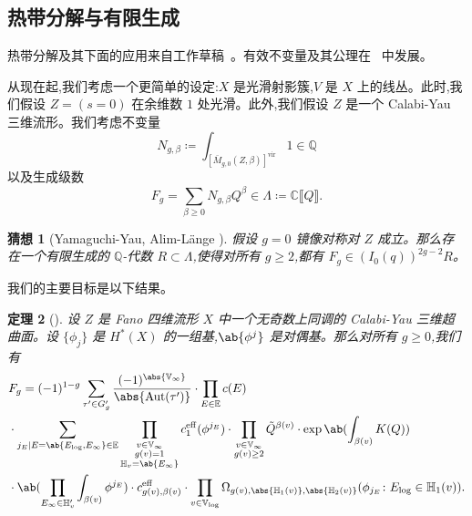\documentclass{amsart}
\newtheorem{thm}{定理}[section]
\newtheorem{conj}[thm]{猜想}
\theoremstyle{definition}
\theoremstyle{remark}
\theoremstyle{plain}
\theoremstyle{definition}
\theoremstyle{remark}
\newcommand{\C}{\mathbb{C}}
\newcommand{\Q}{\mathbb{Q}}
\newcommand{\E}{\mathbb{E}}
\newcommand{\V}{\mathbb{V}}
\renewcommand{\H}{\mathbb{H}}
\newcommand{\mr}[1]{\mathrm{#1}}
\newcommand{\on}[1]{\operatorname{#1}}
\newcommand{\1}{\mathbf{1}}
\newcommand{\2}{\mathbf{2}}
\newcommand{\3}{\mathbf{3}}
\newcommand{\vir}{\mr{vir}}
\newcommand{\ps}[1]{\llbracket #1 \rrbracket}
\DeclareMathOperator{\Aut}{Aut}
\begin{document}
\subsection{热带分解与有限生成}%
\label{sub:Tropical decomposition and finite generation}

热带分解及其下面的应用来自工作草稿~\cite{CJRtropical2025}。有效不变量及其公理在~\cite{CJRpunctured} 中发展。

从现在起,我们考虑一个更简单的设定:\(X\) 是光滑射影簇,\(V\) 是 \(X\) 上的线丛。此时,我们假设 \(Z = (s = 0)\) 在余维数 \(1\) 处光滑。此外,我们假设 \(Z\) 是一个 Calabi-Yau 三维流形。我们考虑不变量
\[ N_{g, \beta} \coloneqq \int_{[\bar{M}_{g,0}(Z, \beta)]^{\vir}} 1 \in \Q \]
以及生成级数
\[ F_g = \sum_{\beta \geq 0} N_{g, \beta} Q^{\beta} \in \Lambda \coloneqq \C \ps{Q}. \]

\begin{conj}[Yamaguchi-Yau, Alim-L\"ange {\cite{YY2004,AlimLange2007}}]
    假设 \(g=0\) 镜像对称对 \(Z\) 成立。那么存在一个有限生成的 \(\Q\)-代数 \(R \subset \Lambda\),使得对所有 \(g \geq 2\),都有 \(F_g \in (I_0(q))^{2g-2} R\)。
\end{conj}

我们的主要目标是以下结果。

\begin{thm}[{\cite{CJRtropical2025}}]
    设 \(Z\) 是 Fano 四维流形 \(X\) 中一个无奇数上同调的 Calabi-Yau 三维超曲面。设 \(\{\phi_j\}\) 是 \(H^*(X)\) 的一组基,\(\ab\{\phi^j\}\) 是对偶基。那么对所有 \(g \geq 0\),我们有
    \begin{align*}
        &F_g = (-1)^{1-g} \sum_{\tau' \in G_g'} \frac{(-1)^{\abs{\V_{\infty}}}}{\abs{\Aut(\tau')}} \cdot \prod_{E \in \E} c(E) \\
        & \cdot \sum_{j_E \mid E = \ab\{E_{\log}, E_{\infty}\} \in \E} \prod_{\substack{v \in \V_{\infty} \\ g(v)=1 \\ \H_v = \ab\{E_{\infty}\}}} c_1^{\mr{eff}}(\phi^{j_E}) \cdot \prod_{\substack{v \in \V_{\infty} \\ g(v) \geq 2}} \tilde{Q}^{\beta(v)} \cdot \exp \ab(\int_{\beta(v)} K(Q) )  \\
        & \cdot \ab(\prod_{E_{\infty} \in \H_v'}\int_{\beta(v)} \phi^{j_E}) \cdot c_{g(v), \beta(v)}^{\on{eff}}
         \cdot \prod_{v \in \V_{\log}} \Omega_{g(v), \abs{\H_1(v)}, \abs{\H_2(v)}} (\phi_{j_E} \colon E_{\log} \in \H_1(v)).
    \end{align*}
\end{thm}
\end{document}
